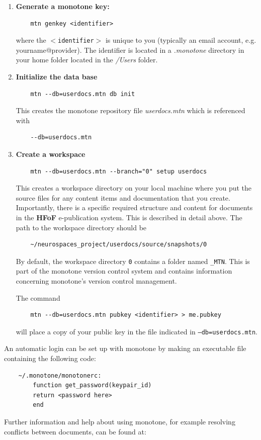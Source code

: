 \documentclass[12pt]{article}
\begin{document}
\begin{enumerate}
\item {\bf Generate a monotone key:} 
\begin{verbatim}
    mtn genkey <identifier>
\end{verbatim}
where the {\tt $<$identifier$>$} is unique to you (typically an email account, e.g. yourname@provider). The identifier is located in a {\it .monotone} directory in your home folder located in the {\it /Users} folder.
\item {\bf Initialize the data base}
\begin{verbatim}
    mtn --db=userdocs.mtn db init
\end{verbatim}
This creates the monotone repository file {\it userdocs.mtn} which is referenced with
\begin{verbatim}
    --db=userdocs.mtn
\end{verbatim}
\item {\bf Create a workspace}
\begin{verbatim}
    mtn --db=userdocs.mtn --branch="0" setup userdocs
\end{verbatim}
This creates a workspace directory on your local machine where you put the source files for any content items and documentation that you create. Importantly, there is a specific required structure and content for documents in the {\bf \small HFoF} e-publication system. This is described in detail above. The path to the workspace directory should be
\begin{verbatim}
    ~/neurospaces_project/userdocs/source/snapshots/0
\end{verbatim}
By default, the workspace directory {\tt 0} contains a folder named {\tt \_MTN}. This is part of the monotone version control system and contains information concerning monotone's version control management.

The command
\begin{verbatim}
    mtn --db=userdocs.mtn pubkey <identifier> > me.pubkey
\end{verbatim}
will place a copy of your public key in the file indicated in {\tt --db=userdocs.mtn}.
\end{enumerate}
An automatic login can be set up with monotone by making an executable file containing the following code:
\begin{verbatim}
    ~/.monotone/monotonerc:
        function get_password(keypair_id)
        return <password here>
        end
\end{verbatim}
Further information and help about using monotone, for example resolving conflicts between documents, can be found at:
\end{document}
